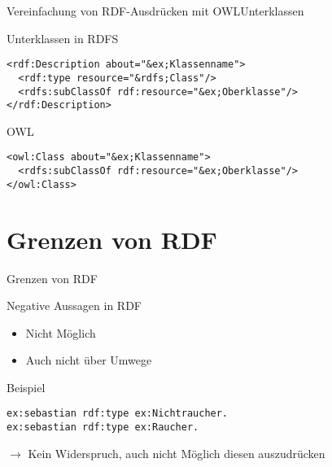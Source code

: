 \documentclass{beamer}
\begin{document}
\begin{frame}[fragile]{Vereinfachung von RDF-Ausdrücken mit
OWL}{Unterklassen}
\begin{block}{Unterklassen in RDFS}
\begin{lstlisting}[lang="xml"]
<rdf:Description about="&ex;Klassenname">
  <rdf:type resource="&rdfs;Class"/>
  <rdfs:subClassOf rdf:resource="&ex;Oberklasse"/>
</rdf:Description>
\end{lstlisting}
\end{block}
\begin{block}{OWL}
\begin{lstlisting}[lang="xml"]
<owl:Class about="&ex;Klassenname">
  <rdfs:subClassOf rdf:resource="&ex;Oberklasse"/>
</owl:Class>
\end{lstlisting}
\end{block}

\end{frame}




\section{Grenzen von RDF}

\begin{frame}[fragile]{Grenzen von RDF}
\begin{block}{Negative Aussagen in RDF}
\begin{itemize}
\item Nicht Möglich
\item Auch nicht über Umwege
\end{itemize}
\end{block}
\begin{exampleblock}{Beispiel}
\begin{lstlisting}
ex:sebastian rdf:type ex:Nichtraucher.
ex:sebastian rdf:type ex:Raucher.
\end{lstlisting}
$\rightarrow$ Kein Widerspruch, auch nicht Möglich diesen auszudrücken
\end{exampleblock}
\end{frame}

\end{document}
